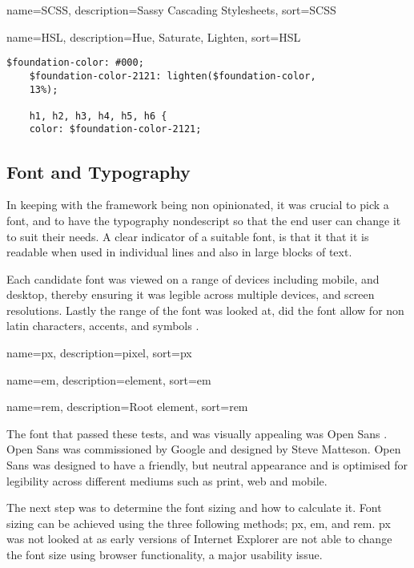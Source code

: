 {
  name={SCSS},
  description={Sassy Cascading Stylesheets},
  sort=SCSS
}

{
  name={HSL},
  description={Hue, Saturate, Lighten},
  sort=HSL
}

\begin{lstlisting}[language=CSS3]
	$foundation-color: #000;
	$foundation-color-2121: lighten($foundation-color, 
	13%);

	h1, h2, h3, h4, h5, h6 {
  	color: $foundation-color-2121;
\end{lstlisting}

\newpage
\subsection*{Font and Typography}
In keeping with the framework being non opinionated, it was crucial to pick a font, and to have the typography nondescript so that the end user can change it to suit their needs. A clear indicator of a suitable font, is that it that it is readable when used in individual lines and also in large blocks of text. 

Each candidate font was viewed on a range of devices including mobile, and desktop, thereby ensuring it was legible across multiple devices, and screen resolutions. Lastly the range of the font was looked at, did the font allow for non latin characters, accents, and symbols \citep{WORD16}.

{
  name={px},
  description={pixel},
  sort=px
}
%

{
  name={em},
  description={element},
  sort=em
}
%

{
  name={rem},
  description={Root element},
  sort=rem
}
%

The font that passed these tests, and was visually appealing was Open Sans \citep{MATT17}. Open Sans was commissioned by Google and designed by Steve Matteson. Open Sans was designed to have a friendly, but neutral appearance and is optimised for legibility across different mediums such as print, web and mobile. 

The next step was to determine the font sizing and how to calculate it. Font sizing can be achieved using the three following methods; \gls{px}, \gls{em}, and \gls{rem}. \gls{px} was not looked at as early versions of Internet Explorer are not able to change the font size using browser functionality, a major usability issue. 

